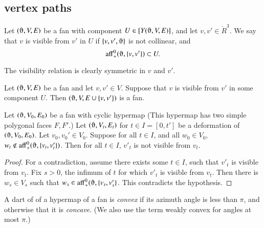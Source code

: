 %

\subsection{vertex paths} %


\begin{definition}
Let $(\orgn,V,E)$ be a fan with component $U\in \comp{Y(\orgn,V,E)}$, 
and let $v,v'\in \ring{R}^3$.  We say
that $v$ is visible from $v'$ in $U$ 
if $\{v,v',\orgn\}$ is not
collinear,  and
  $$\op{aff}_+^0(\orgn,\{v,v'\})\subset U.$$
\end{definition}

The visibility relation is clearly symmetric in $v$ and $v'$.

\begin{lemma} Let $(\orgn,V,E)$ be a fan and let $v,v'\in V$.
Suppose that $v$ is visible from $v'$ in some component $U$.  
Then
$(\orgn,V,E\cup\{v,v'\})$ is a fan.
\end{lemma}



\begin{lemma}  Let $(\orgn,V_0,E_0)$ be a fan with cyclic hypermap
(This
hypermap has two simple polygonal faces $F,F'$.)  Let $(\orgn,V_t,E_t)$
for $t\in I = [0,t']$ be a deformation of $(\orgn,V_0,E_0)$. 
Let $v_0,v_0'\in V_0$.  Suppose for all $t\in I$, and all $w_0\in V_0$,
$w_t\not\in \op{aff}_+^0(\orgn,\{v_t,v_t'\})$.
Then for all $t\in I$, $v'_t$ is not visible from $v_t$.
\end{lemma}

\begin{proof} For a contradiction, assume there exists some $t\in I$,
such that $v'_t$ is visible from $v_t$.  
Fix $s>0$, the infimum of $t$ for which $v'_t$ is visible
from $v_t$.   Then there is $w_s\in V_s$ such that
$w_s\in \op{aff}_+^0(\orgn,\{v_s,v_s'\}$.  This contradicts the hypothesis.
\end{proof}



\begin{definition}\label{def:concave}
A dart of of a hypermap of a fan is {\it convex\/}
if its azimuth angle is less than $\pi$, and otherwise that it
is {\it concave}.  (We also use the term weakly convex for angles at most $\pi$.)
%
\end{definition}



